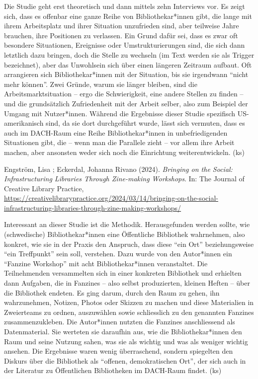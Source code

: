 \documentclass[a4paper,
fontsize=11pt,
oneside,
numbers=noperiodatend,
parskip=half-,
bibliography=totoc,
final
]{scrartcl}
\begin{document}
Die Studie geht erst theoretisch und dann mittels zehn Interviews vor.
Es zeigt sich, dass es offenbar eine ganze Reihe von Bibliothekar*innen
gibt, die lange mit ihrem Arbeitsplatz und ihrer Situation unzufrieden
sind, aber teilweise Jahre brauchen, ihre Positionen zu verlassen. Ein
Grund dafür sei, dass es zwar oft besondere Situationen, Ereignisse oder
Umstrukturierungen sind, die sich dann letztlich dazu bringen, doch die
Stelle zu wechseln (im Text werden sie als Trigger bezeichnet), aber das
Unwohlsein sich über einen längeren Zeitraum aufbaut. Oft arrangieren
sich Bibliothekar*innen mit der Situation, bis sie irgendwann
\enquote{nicht mehr können}. Zwei Gründe, warum sie länger bleiben, sind
die Arbeitsmarktsituation -- ergo die Schwierigkeit, eine andere Stellen
zu finden -- und die grundsätzlich Zufriedenheit mit der Arbeit selber,
also zum Beispiel der Umgang mit Nutzer*innen. Während die Ergebnisse
dieser Studie spezifisch US-amerikanisch sind, da sie dort durchgeführt
wurde, lässt sich vermuten, dass es auch im DACH-Raum eine Reihe
Bibliothekar*innen in unbefriedigenden Situationen gibt, die -- wenn man
die Parallele zieht -- vor allem ihre Arbeit machen, aber ansonsten
weder sich noch die Einrichtung weiterentwickeln. (ks)

Engström, Lisa ; Eckerdal, Johanna Rivano (2024). \emph{Bringing on the
Social: Infrastructuring Libraries Through Zine-making Workshops}. In:
The Journal of Creative Library Practice,
\url{https://creativelibrarypractice.org/2024/03/14/bringing-on-the-social-infrastructuring-libraries-through-zine-making-workshops/}

Interessant an dieser Studie ist die Methodik. Herausgefunden werden
sollte, wie (schwedische) Bibliothekar*innen eine Öffentliche Bibliothek
wahrnehmen, also konkret, wie sie in der Praxis den Anspruch, dass diese
\enquote{ein Ort} beziehungsweise \enquote{ein Treffpunkt} sein soll,
verstehen. Dazu wurde von den Autor*innen ein \enquote{Fanzine Workshop}
mit acht Bibliothekar*innen veranstaltet. Die Teilnehmenden versammelten
sich in einer konkreten Bibliothek und erhielten dann Aufgaben, die in
Fanzines -- also selbst produzierten, kleinen Heften -- über die
Bibliothek endeten. Es ging darum, durch den Raum zu gehen, ihn
wahrzunehmen, Notizen, Photos oder Skizzen zu machen und diese
Materialien in Zweierteams zu ordnen, auszuwählen sowie schliesslich zu
den genannten Fanzines zusammenzukleben. Die Autor*innen nutzten die
Fanzines anschliessend als Datenmaterial. Sie werteten sie daraufhin
aus, wie die Bibliothekar*innen den Raum und seine Nutzung sahen, was
sie als wichtig und was als weniger wichtig ansehen. Die Ergebnisse
waren wenig überraschend, sondern spiegelten den Diskurs über die
Bibliothek als \enquote{offenen, demokratischen Ort}, der sich auch in
der Literatur zu Öffentlichen Bibliotheken im DACH-Raum findet. (ks)
\end{document}
